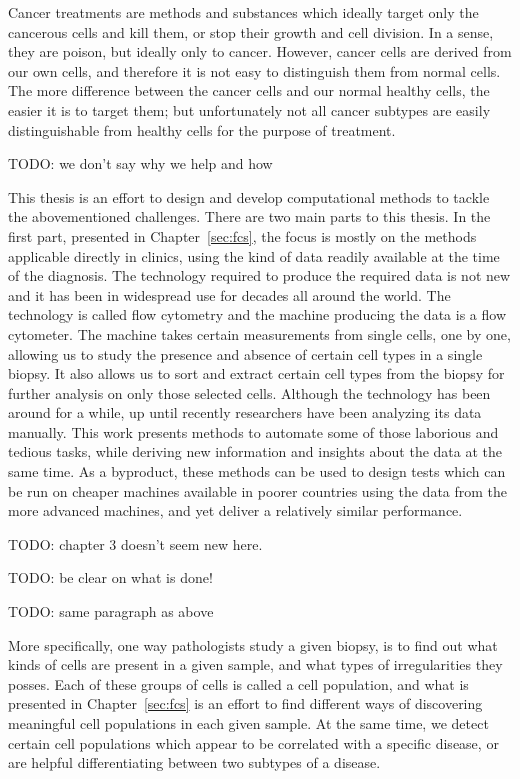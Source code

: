 Cancer treatments are methods and substances which ideally target only the
cancerous cells and kill them, or stop their growth and cell division. In a
sense, they are poison, but ideally only to cancer. However, cancer cells are
derived from our own cells, and therefore it is not easy to distinguish them
from normal cells. The more difference between the cancer cells and our normal
healthy cells, the easier it is to target them; but unfortunately not all
cancer subtypes are easily distinguishable from healthy cells for the purpose
of treatment.

TODO: we don't say why we help and how

This thesis is an effort to design and develop computational methods to tackle
the abovementioned challenges. There are two main parts to this thesis. In the
first part, presented in Chapter~\ref{sec:fcs}, the focus is mostly on the
methods applicable directly in clinics, using the kind of data readily
available at the time of the diagnosis. The technology required to produce the
required data is not new and it has been in widespread use for decades all
around the world. The technology is called flow cytometry and the machine
producing the data is a flow cytometer. The machine takes certain measurements
from single cells, one by one, allowing us to study the presence and absence of
certain cell types in a single biopsy. It also allows us to sort and extract
certain cell types from the biopsy for further analysis on only those selected
cells. Although the technology has been around for a while, up until recently
researchers have been analyzing its data manually. This work presents methods
to automate some of those laborious and tedious tasks, while deriving new
information and insights about the data at the same time. As a byproduct, these
methods can be used to design tests which can be run on cheaper machines
available in poorer countries using the data from the more advanced machines,
and yet deliver a relatively similar performance.

TODO: chapter 3 doesn't seem new here.

TODO: be clear on what is done!

TODO: same paragraph as above

More specifically, one way pathologists study a given biopsy, is to find out
what kinds of cells are present in a given sample, and what types of
irregularities they posses. Each of these groups of cells is called a cell
population, and what is presented in Chapter~\ref{sec:fcs} is an effort to find
different ways of discovering meaningful cell populations in each given sample.
At the same time, we detect certain cell populations which appear to be
correlated with a specific disease, or are helpful differentiating between
two subtypes of a disease.

